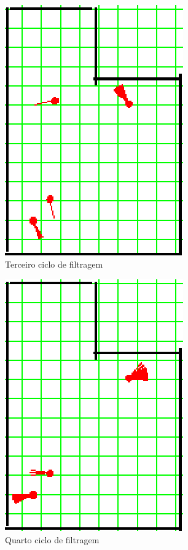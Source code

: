 \begin{figure}[H]
  \centering
  \includegraphics[scale=1]{figuras/cen2_ex1/4.eps}
  \caption[Terceiro Ciclo de Filtragem]{Terceiro ciclo de filtragem}
  \label{img:cen2_ex1_4}
\end{figure}

\begin{figure}[H]
  \centering
  \includegraphics[scale=1]{figuras/cen2_ex1/5.eps}
  \caption[Quarto Ciclo de Filtragem]{Quarto ciclo de filtragem}
  \label{img:cen2_ex1_5}
\end{figure}

